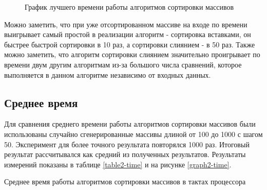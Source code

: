 \documentclass[12pt, a4paper]{report}
\begin{document}
	\begin{figure}[ht!]
		\caption{График лучшего времени работы алгоритмов сортировки массивов}
		\label{graph-time}
	\end{figure}

	Можно заметить, что при уже отсортированном массиве на входе по времени выигрывает самый простой в реализации алгоритм - сортировка вставками, он быстрее быстрой сортировки в 10 раз, а сортировки слиянием - в 50 раз. Также можно заметить, что алгоритм сортировки слиянием значительно проигрывает по времени двум другим алгоритмам из-за большого числа сравнений, которое выполняется в данном алгоритме независимо от входных данных.

	\newpage
	
	\subsection{Среднее время}
	Для сравнения среднего времени работы алгоритмов сортировки массивов были использованы случайно сгенерированные массивы длиной от 100 до 1000 с шагом 50. Эксперимент для более точного результата повторялся 1000 раз. Итоговый результат рассчитывался как средний из полученных результатов. Результаты измерений показаны в таблице \ref{table2-time} и на рисунке \ref{graph2-time}.\\
	\begin{table}[ht!]
		\caption{Среднее время работы алгоритмов сортировки массивов в тактах процессора}
		\label{table2-time}
		\begin{center}
		\end{center}
	\end{table}
	
\end{document}
